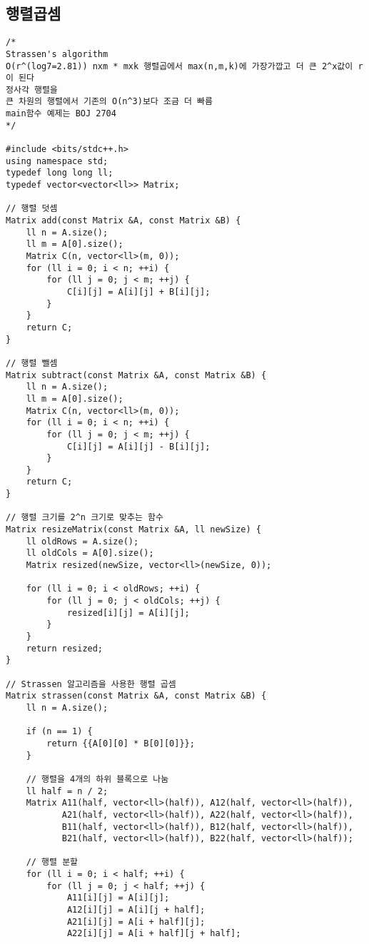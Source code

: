 \documentclass[landscape, 8pt, a4paper, oneside, twocolumn]{extarticle}
\begin{document}
    \subsection {행렬곱셈}
    \begin{verbatim}
/*
Strassen's algorithm
O(r^(log7=2.81)) nxm * mxk 행렬곱에서 max(n,m,k)에 가장가깝고 더 큰 2^x값이 r이 된다
정사각 행렬을
큰 차원의 행렬에서 기존의 O(n^3)보다 조금 더 빠름
main함수 예제는 BOJ 2704
*/

#include <bits/stdc++.h>
using namespace std;
typedef long long ll;
typedef vector<vector<ll>> Matrix;

// 행렬 덧셈
Matrix add(const Matrix &A, const Matrix &B) {
    ll n = A.size();
    ll m = A[0].size();
    Matrix C(n, vector<ll>(m, 0));
    for (ll i = 0; i < n; ++i) {
        for (ll j = 0; j < m; ++j) {
            C[i][j] = A[i][j] + B[i][j];
        }
    }
    return C;
}

// 행렬 뺄셈
Matrix subtract(const Matrix &A, const Matrix &B) {
    ll n = A.size();
    ll m = A[0].size();
    Matrix C(n, vector<ll>(m, 0));
    for (ll i = 0; i < n; ++i) {
        for (ll j = 0; j < m; ++j) {
            C[i][j] = A[i][j] - B[i][j];
        }
    }
    return C;
}

// 행렬 크기를 2^n 크기로 맞추는 함수
Matrix resizeMatrix(const Matrix &A, ll newSize) {
    ll oldRows = A.size();
    ll oldCols = A[0].size();
    Matrix resized(newSize, vector<ll>(newSize, 0));

    for (ll i = 0; i < oldRows; ++i) {
        for (ll j = 0; j < oldCols; ++j) {
            resized[i][j] = A[i][j];
        }
    }
    return resized;
}

// Strassen 알고리즘을 사용한 행렬 곱셈
Matrix strassen(const Matrix &A, const Matrix &B) {
    ll n = A.size();

    if (n == 1) {
        return {{A[0][0] * B[0][0]}};
    }

    // 행렬을 4개의 하위 블록으로 나눔
    ll half = n / 2;
    Matrix A11(half, vector<ll>(half)), A12(half, vector<ll>(half)),
           A21(half, vector<ll>(half)), A22(half, vector<ll>(half)),
           B11(half, vector<ll>(half)), B12(half, vector<ll>(half)),
           B21(half, vector<ll>(half)), B22(half, vector<ll>(half));

    // 행렬 분할
    for (ll i = 0; i < half; ++i) {
        for (ll j = 0; j < half; ++j) {
            A11[i][j] = A[i][j];
            A12[i][j] = A[i][j + half];
            A21[i][j] = A[i + half][j];
            A22[i][j] = A[i + half][j + half];


\end{verbatim}
\end{document}
